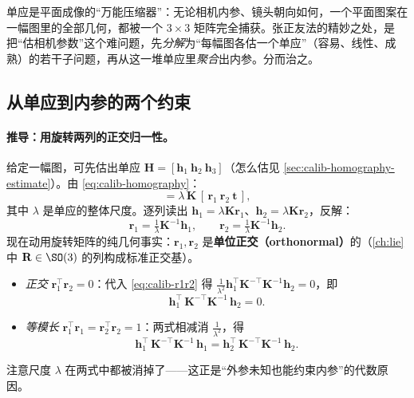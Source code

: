 \begin{insight}
单应是平面成像的“万能压缩器”：无论相机内参、镜头朝向如何，一个平面图案在一幅图里的全部几何，都被一个 $3\times3$ 矩阵完全捕获。张正友法的精妙之处，是把“估相机参数”这个难问题，先\emph{分解}为“每幅图各估一个单应”（容易、线性、成熟）的若干子问题，再从这一堆单应里\emph{聚合}出内参。分而治之。
\end{insight}

\subsection{从单应到内参的两个约束}
\label{sec:calib-two-constraints}

\paragraph{推导：用旋转两列的正交归一性。}
给定一幅图，可先估出单应 $\mathbf{H}=[\mathbf{h}_1\ \mathbf{h}_2\ \mathbf{h}_3]$（怎么估见 \cref{sec:calib-homography-estimate}）。由 \cref{eq:calib-homography}\cite{zhang2000calibration}：
\begin{equation}
  [\,\mathbf{h}_1\ \mathbf{h}_2\ \mathbf{h}_3\,]=\lambda\,\mathbf{K}\,[\,\mathbf{r}_1\ \mathbf{r}_2\ \mathbf{t}\,],
\end{equation}
其中 $\lambda$ 是单应的整体尺度。逐列读出 $\mathbf{h}_1=\lambda\mathbf{K}\mathbf{r}_1$、$\mathbf{h}_2=\lambda\mathbf{K}\mathbf{r}_2$，反解：
\begin{equation}
  \mathbf{r}_1=\tfrac1\lambda\mathbf{K}^{-1}\mathbf{h}_1,\qquad
  \mathbf{r}_2=\tfrac1\lambda\mathbf{K}^{-1}\mathbf{h}_2.
  \label{eq:calib-r1r2}
\end{equation}
现在动用旋转矩阵的纯几何事实：$\mathbf{r}_1,\mathbf{r}_2$ 是\textbf{单位正交（orthonormal）}的（\cref{ch:lie} 中 $\mathbf{R}\in\SO(3)$ 的列构成标准正交基）。
\begin{itemize}
  \item \emph{正交} $\mathbf{r}_1^\top\mathbf{r}_2=0$：代入 \cref{eq:calib-r1r2} 得 $\tfrac1{\lambda^2}\mathbf{h}_1^\top\mathbf{K}^{-\top}\mathbf{K}^{-1}\mathbf{h}_2=0$，即
  \begin{equation}
    \mathbf{h}_1^\top\,\mathbf{K}^{-\top}\mathbf{K}^{-1}\,\mathbf{h}_2 = 0.
    \label{eq:calib-constraint1}
  \end{equation}
  \item \emph{等模长} $\mathbf{r}_1^\top\mathbf{r}_1=\mathbf{r}_2^\top\mathbf{r}_2=1$：两式相减消 $\tfrac1{\lambda^2}$，得
  \begin{equation}
    \mathbf{h}_1^\top\,\mathbf{K}^{-\top}\mathbf{K}^{-1}\,\mathbf{h}_1 = \mathbf{h}_2^\top\,\mathbf{K}^{-\top}\mathbf{K}^{-1}\,\mathbf{h}_2.
    \label{eq:calib-constraint2}
  \end{equation}
\end{itemize}
注意尺度 $\lambda$ 在两式中都被消掉了——这正是“外参未知也能约束内参”的代数原因。

